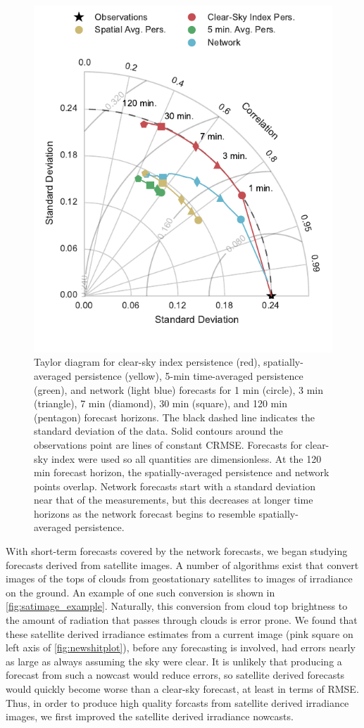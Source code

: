 \begin{figure}[htbp]
\centering
\includegraphics[width=.7\textwidth]{figs/taylor_diagram.pdf}
\caption[Taylor diagram for the network and various persistence
forecasts]{Taylor diagram for clear-sky index persistence (red),
  spatially-averaged persistence (yellow), 5-min time-averaged
  persistence (green), and network (light blue) forecasts for 1 min
  (circle), 3 min (triangle), 7 min (diamond), 30 min (square), and
  120 min (pentagon) forecast horizons. The black dashed line
  indicates the standard deviation of the data. Solid contours around
  the observations point are lines of constant CRMSE. Forecasts for
  clear-sky index were used so all quantities are dimensionless. At
  the 120 min forecast horizon, the spatially-averaged persistence and
  network points overlap. Network forecasts start with a standard
  deviation near that of the measurements, but this decreases at
  longer time horizons as the network forecast begins to resemble
  spatially-averaged persistence.
}
\label{fig:taylor}
\end{figure}

With short-term forecasts covered by the network forecasts, we began
studying forecasts derived from satellite images.
A number of algorithms exist that convert images of the tops of clouds
from geostationary satellites to images of irradiance on the ground.
An example of one such conversion is shown in
\cref{fig:satimage_example}.
Naturally, this conversion from cloud top brightness to the amount of
radiation that passes through clouds is error prone.
We found that these satellite derived irradiance estimates from a
current image (pink square on left axis of \cref{fig:newshitplot}),
before any forecasting is involved, had errors nearly as large as
always assuming the sky were clear.
It is unlikely that producing a forecast from such a nowcast would
reduce errors, so satellite derived forecasts would quickly become
worse than a clear-sky forecast, at least in terms of RMSE.
Thus, in order to produce high quality forcasts from satellite derived
irradiance images, we first improved the satellite derived irradiance
nowcasts.

